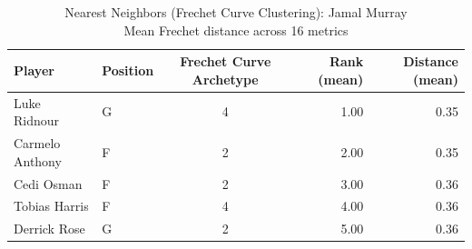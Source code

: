 \begin{table}[t]
\caption*{
{\fontsize{20}{25} Nearest Neighbors (Frechet Curve Clustering): Jamal Murray\fontsize{12}{15}\selectfont } \\ 
{\fontsize{14}{17}\selectfont  Mean Frechet distance across 16 metrics\fontsize{12}{15}\selectfont }
} 
\fontsize{12.0pt}{14.0pt}\selectfont
\begin{tabular*}{\linewidth}{@{\extracolsep{\fill}}llcrr}
\toprule
Player & Position & Frechet Curve Archetype & Rank (mean) & Distance (mean) \\ 
\midrule\addlinespace[2.5pt]
Luke Ridnour & G & 4 & 1.00 & 0.35 \\ 
Carmelo Anthony & F & 2 & 2.00 & 0.35 \\ 
Cedi Osman & F & 2 & 3.00 & 0.36 \\ 
Tobias Harris & F & 4 & 4.00 & 0.36 \\ 
Derrick Rose & G & 2 & 5.00 & 0.36 \\ 
\bottomrule
\end{tabular*}
\end{table}

